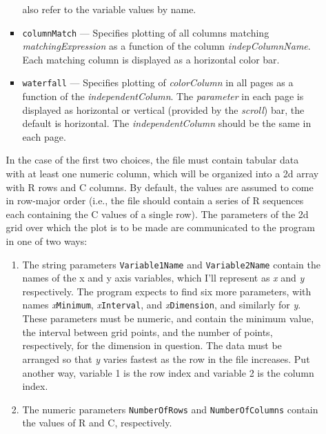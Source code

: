 \begin{itemize}
\begin{itemize}
\begin{itemize}
        also refer to the variable values by name.
        \item \verb|columnMatch| --- Specifies plotting of all columns matching {\em matchingExpression}
        as a function of the column {\em indepColumnName}.  Each matching column is displayed as a horizontal 
        color bar. 
        \item \verb|waterfall| --- Specifies plotting of {\em colorColumn} in all pages as a function of the
        {\em independentColumn}. The {\em parameter} in each page is displayed as horizontal or vertical (provided
        by the {\em scroll}) bar, the default is horizontal. The {\em independentColumn} should be the same in
        each page.
        \end{itemize}

        In the case of the first two choices, the file must contain
tabular data with at least one numeric column, which will be organized
into a 2d array with R rows and C columns.  By default, the values are
assumed to come in row-major order (i.e., the file should contain a
series of R sequences each containing the C values of a single row).
The parameters of the 2d grid over which the plot is to be made are
communicated to the program in one of two ways:

\begin{enumerate}

\item The string parameters \verb|Variable1Name| and \verb|Variable2Name| contain the names of the 
x and y axis variables, which I'll represent as {\em x} and {\em y} respectively.  The program expects to find
six more parameters, with names {\em x}\verb|Minimum|, {\em x}\verb|Interval|, and {\em x}\verb|Dimension|,
and similarly for {\em y}.  These parameters must be numeric, and contain the minimum value, the interval
between grid points, and the number of points, respectively, for the dimension in question.
The data must be arranged so that {\em y} varies fastest as the row in the file increases.  Put another
way, variable 1 is the row index and variable 2 is the column index.
\item The numeric parameters \verb|NumberOfRows| and \verb|NumberOfColumns| contain the values of R and
C, respectively.
\end{enumerate}


\end{itemize}
\end{itemize}
